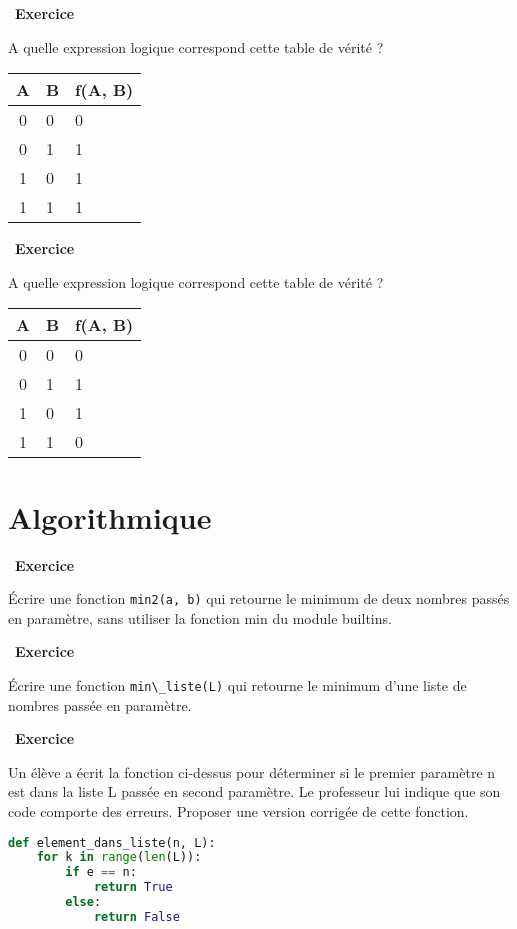 \documentclass[
  11pt,
]{article}
\newcommand{\passthrough}[1]{#1}
\newcounter{exo}
\newenvironment{exercice}[1]
{\par \medskip   \addtocounter{exo}{1} \noindent  
\begin{bclogo}[arrondi =0.1,   noborder = true, logo=\bccrayon, marge=4]{~\textbf{Exercice} \textbf{\theexo} {\itshape #1} }  \par}
{
\end{bclogo}
 \par \bigskip }
\newcounter{def}
\newcounter{alg}
\newcounter{logi}
\begin{document}
\begin{exercice}{}

A quelle expression logique correspond cette table de vérité ?

\begin{longtable}[]{@{}cll@{}}
\toprule
A & B & f(A, B)\tabularnewline
\midrule
\endhead
0 & 0 & 0\tabularnewline
0 & 1 & 1\tabularnewline
1 & 0 & 1\tabularnewline
1 & 1 & 1\tabularnewline
\bottomrule
\end{longtable}

\end{exercice}

\begin{exercice}{}

A quelle expression logique correspond cette table de vérité ?

\begin{longtable}[]{@{}cll@{}}
\toprule
A & B & f(A, B)\tabularnewline
\midrule
\endhead
0 & 0 & 0\tabularnewline
0 & 1 & 1\tabularnewline
1 & 0 & 1\tabularnewline
1 & 1 & 0\tabularnewline
\bottomrule
\end{longtable}

\end{exercice}

\hypertarget{algorithmique}{%
\section{Algorithmique}\label{algorithmique}}

\begin{exercice}{}

Écrire une fonction \passthrough{\lstinline!min2(a, b)!} qui retourne le
minimum de deux nombres passés en paramètre, sans utiliser la fonction
min du module builtins.

\end{exercice}

\begin{exercice}{}

Écrire une fonction \passthrough{\lstinline!min\_liste(L)!} qui retourne
le minimum d'une liste de nombres passée en paramètre.

\end{exercice}

\begin{exercice}{}

Un élève a écrit la fonction ci-dessus pour déterminer si le premier
paramètre n est dans la liste L passée en second paramètre. Le
professeur lui indique que son code comporte des erreurs. Proposer une
version corrigée de cette fonction.

\begin{lstlisting}[language=Python]
def element_dans_liste(n, L):
    for k in range(len(L)):
        if e == n:
            return True
        else:
            return False
\end{lstlisting}

\end{exercice}
\end{document}
